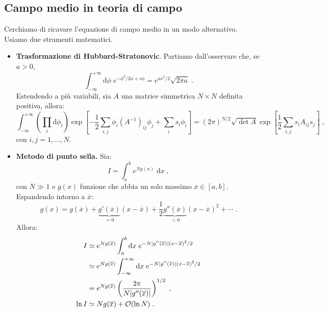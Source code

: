 \documentclass[10pt,a4paper]{report}
\theoremstyle{definition}
\numberwithin{equation}{section}
\newcommand{\diff}[1][]{\mathrm{d}#1}
\begin{document}
\subsection{Campo medio in teoria di campo}
Cerchiamo di ricavare l'equazione di campo medio in un modo alternativo. Usiamo due strumenti matematici.

\begin{itemize}
\item \textbf{Trasformazione di Hubbard-Stratonovic}. Partiamo dall'osservare che, se $a>0$,
$$
\int_{-\infty}^{+\infty}\diff{\phi}\; e^{-\phi^2/2a+s\phi}=e^{as^2/2}\sqrt{2\pi a}\;.
$$
Estendendo a più variabili, sia $A$ una matrice simmetrica $N\times N$ definita positiva, allora:
\begin{equation}
\int_{-\infty}^{+\infty}\left(\prod_i\diff{\phi_i}\right)\exp\left[-\frac{1}{2}\sum_{i,j}\phi_i\left(A^{-1}\right)_{ij}\phi_j+\sum_is_i\phi_i\right]=(2\pi)^{N/2}\sqrt{\det A}\exp\left[\frac{1}{2}\sum_{i,j}s_iA_{ij}s_j\right]\;,
\end{equation}
con $i,j=1,\ldots,N$.
\item \textbf{Metodo di punto sella.} Sia:
$$
I=\int_a^b e^{Ng(x)}\;\diff{x}\;,
$$
con $N\gg 1$ e $g(x)$ funzione che abbia un solo massimo $\overline{x}\in [a,b]$. Espandendo intorno a $\overline{x}$:
$$
g(x)=g(\overline{x})+\underbrace{g'(\overline{x})}_{=0}(x-\overline{x})+\frac{1}{2}\underbrace{g''(\overline{x})}_{<0}(x-\overline{x})^2+\cdots\;.
$$
Allora:
\begin{align}
I &\simeq e^{Ng(\overline{x})}\int_a^b\diff{x}\; e^{-N|g''(\overline{x})|(x-\overline{x})^2/2} \notag \\
&\simeq e^{Ng(\overline{x})}\int_{-\infty}^{+\infty}\diff{x}\;e^{-N|g''(\overline{x})|(x-\overline{x})^2/2} \notag \\
&= e^{Ng(\overline{x})}\left(\frac{2\pi}{N|g''(\overline{x})|}\right)^{1/2}\;, \\
\ln I &\simeq Ng(\overline{x})+\mathcal{O}(\ln N)\;.
\end{align}
\end{itemize}
\end{document}

